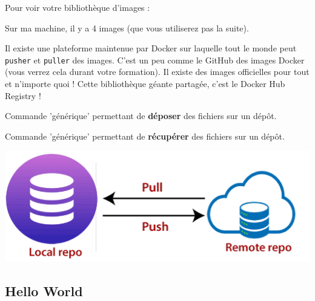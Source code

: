 \documentclass[french, 12pt]{article}%
\newcommand{\titreencadre}{Titre}
\newenvironment{encadre}[1]{\renewcommand{\titreencadre}{#1}
	\begin{mdframed}[style=encadrestyle]
	\vspace{0.5\baselineskip}
	}{%
	\end{mdframed}}
\begin{document}
Pour voir votre bibliothèque d'images :


Sur ma machine, il y a 4 images (que vous utiliserez pas la suite).

\vspace{0.5cm}


Il existe une plateforme maintenue par Docker sur laquelle tout le monde peut \verb?pusher? et \verb?puller? des images. C'est un peu comme le GitHub des images Docker (vous verrez cela durant votre formation). Il existe des images officielles pour tout et n'importe quoi ! Cette bibliothèque géante partagée, c'est le Docker Hub Registry !

\begin{encadre}{Push}
Commande 'générique' permettant de \textbf{déposer} des fichiers sur un dépôt. 
\end{encadre}
\begin{encadre}{Pull}
Commande 'générique' permettant de \textbf{récupérer} des fichiers sur un dépôt. 
\end{encadre}

\begin{center}
\includegraphics[scale=0.7]{./ressource/pull_push.png}
\end{center}





\subsection{Hello World}
\end{document}
